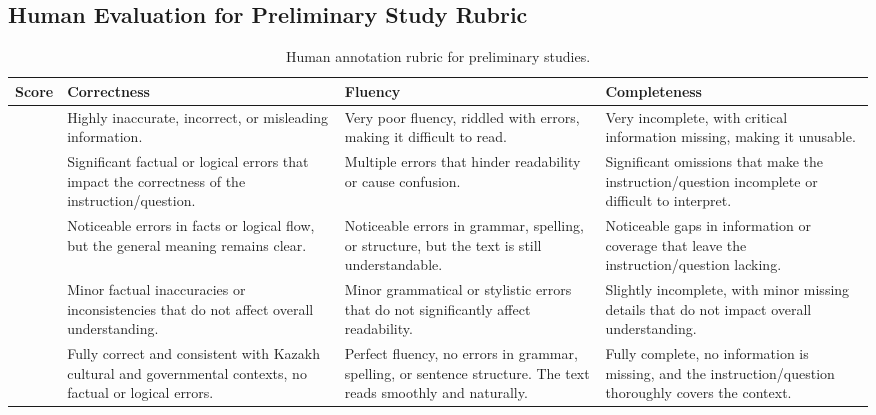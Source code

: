 
\subsection{Human Evaluation for Preliminary Study Rubric}
\FloatBarrier

\begin{table*}[h]
\centering
\renewcommand{\arraystretch}{1.5} %
\scriptsize %
\begin{tabular}{>{\centering\arraybackslash}p{1.5cm}|>{\centering\arraybackslash}p{3.5cm}|>{\centering\arraybackslash}p{3.5cm}|>{\centering\arraybackslash}p{3.5cm}}
\hline
\textbf{Score} & \textbf{Correctness} & \textbf{Fluency} & \textbf{Completeness} \\ \hline
1 & Highly inaccurate, incorrect, or misleading information. & Very poor fluency, riddled with errors, making it difficult to read. & Very incomplete, with critical information missing, making it unusable. \\ \hline
2 & Significant factual or logical errors that impact the correctness of the instruction/question. & Multiple errors that hinder readability or cause confusion. & Significant omissions that make the instruction/question incomplete or difficult to interpret.  \\ \hline
3 & Noticeable errors in facts or logical flow, but the general meaning remains clear.
& Noticeable errors in grammar, spelling, or structure, but the text is still understandable. & Noticeable gaps in information or coverage that leave the instruction/question lacking. \\ \hline
4 & Minor factual inaccuracies or inconsistencies that do not affect overall understanding. & Minor grammatical or stylistic errors that do not significantly affect readability. & Slightly incomplete, with minor missing details that do not impact overall understanding. \\ \hline
5 & Fully correct and consistent with Kazakh cultural and governmental contexts, no factual or logical errors. & Perfect fluency, no errors in grammar, spelling, or sentence structure. The text reads smoothly and naturally. & Fully complete, no information is missing, and the instruction/question thoroughly covers the context.\\ \hline

\end{tabular}
\caption{Human annotation rubric for preliminary studies.}
\label{tab:multilingual-issues}
\end{table*}

\FloatBarrier



